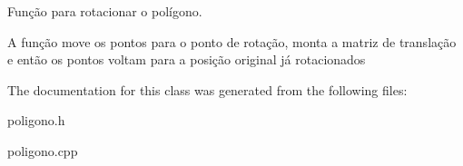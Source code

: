 Função para rotacionar o polígono. 

A função move os pontos para o ponto de rotação, monta a matriz de translação e então os pontos voltam para a posição original já rotacionados 

The documentation for this class was generated from the following files\+:\begin{DoxyCompactItemize}
\item 
poligono.\+h\item 
poligono.\+cpp\end{DoxyCompactItemize}
